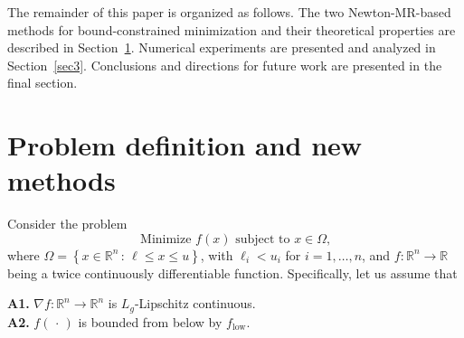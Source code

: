 \documentclass[11pt]{article}
\begin{document}
The remainder of this paper is organized as follows. The two Newton-MR-based methods for bound-constrained minimization and their theoretical properties are described in Section~\ref{sec2}. Numerical experiments are presented and analyzed in Section~\ref{sec3}. Conclusions and directions for future work are presented in the final section.

\section{Problem definition and new methods} \label{sec2}

Consider the problem
\[
\text{Minimize $f(x)$ subject to $x \in \Omega$,}
\]
\noindent where $\Omega=\left\{x\in\mathbb{R}^{n}\,:\,\ell\leq x\leq u\right\}$, with $\ell_{i}<u_{i}$ for $i=1,\dots,n$, and $f:\mathbb{R}^{n}\to\mathbb{R}$ being a twice continuously differentiable function. Specifically, let us assume that
\vspace{0.1cm}
\begin{mdframed}
\noindent\textbf{A1.} $\nabla f:\mathbb{R}^{n}\to\mathbb{R}^{n}$ is $L_{g}$-Lipschitz continuous.\\
\noindent\textbf{A2.} $f(\,\cdot\,)$ is bounded from below by $f_{\mathrm{low}}$. 
\end{mdframed}
\vspace{0.1cm}
\end{document}

